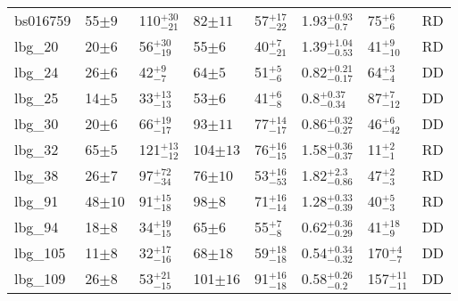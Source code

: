 \documentclass[fleqn,usenatbib]{mnras}
\begin{document}
\begin{table*}
\begin{threeparttable}
\begin{tabular}{llllllll}
bs016759        & 55$\pm9$                    & 110$^{+30}_{-21}$                    & 82$\pm11$                  & 57$^{+17}_{-22}$         & 1.93$^{+0.93}_{-0.7}$               & 75$^{+6}_{-6}$ & RD    \\[1ex]
lbg\_20         & 20$\pm6$                    & 56$^{+30}_{-19}$                     & 55$\pm6$                  & 40$^{+7}_{-21}$         & 1.39$^{+1.04}_{-0.53}$              & 41$^{+9}_{-10}$ & RD   \\[1ex]
lbg\_24         & 26$\pm6$                    & 42$^{+9}_{-7}$                     & 64$\pm5$                  & 51$^{+5}_{-6}$           & 0.82$^{+0.21}_{-0.17}$          & 64$^{+3}_{-4}$ & DD   \\[1ex]
lbg\_25         & 14$\pm5$                    & 33$^{+13}_{-13}$                     & 53$\pm6$                  & 41$^{+6}_{-8}$         & 0.8$^{+0.37}_{-0.34}$                  & 87$^{+7}_{-12}$  & DD   \\[1ex]
lbg\_30         & 20$\pm6$                    & 66$^{+19}_{-17}$                    & 93$\pm11$                 & 77$^{+14}_{-17}$       & 0.86$^{+0.32}_{-0.27}$               & 46$^{+6}_{-42}$ & DD \\[1ex]
lbg\_32         & 65$\pm5$                    & 121$^{+13}_{-12}$                    & 104$\pm13$                 & 76$^{+16}_{-15}$       & 1.58$^{+0.36}_{-0.37}$               & 11$^{+2}_{-1}$ & RD \\[1ex]
lbg\_38         & 26$\pm7$                    & 97$^{+72}_{-34}$                     & 76$\pm10$                  & 53$^{+16}_{-53}$       & 1.82$^{+2.3}_{-0.86}$               & 47$^{+2}_{-3}$  & RD   \\[1ex]
lbg\_91         & 48$\pm10$                    & 91$^{+15}_{-18}$                     & 98$\pm8$                  & 71$^{+16}_{-14}$        & 1.28$^{+0.33}_{-0.39}$              & 40$^{+5}_{-3}$  & RD  \\[1ex]
lbg\_94         & 18$\pm8$                    & 34$^{+19}_{-15}$                     & 65$\pm6$                  & 55$^{+7}_{-8}$         & 0.62$^{+0.36}_{-0.29}$                & 41$^{+18}_{-9}$  & DD  \\[1ex]
lbg\_105        & 11$\pm8$                    & 32$^{+17}_{-16}$                     & 68$\pm18$                  & 59$^{+18}_{-18}$        & 0.54$^{+0.34}_{-0.32}$                & 170$^{+4}_{-7}$ & DD  \\[1ex]
lbg\_109        & 26$\pm8$                    & 53$^{+21}_{-15}$                     & 101$\pm16$                 & 91$^{+16}_{-18}$      & 0.58$^{+0.26}_{-0.2}$                & 157$^{+11}_{-11}$ & DD  \\[1ex]

\end{tabular}
\end{threeparttable}
\end{table*}
\end{document}
